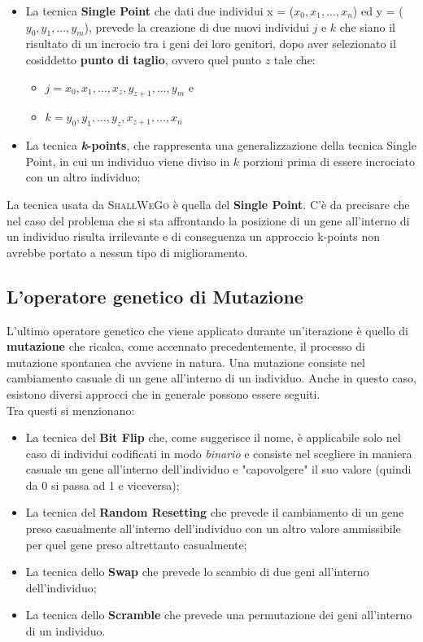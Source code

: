         \begin{itemize}
            \item La tecnica \textbf{Single Point} che dati due individui x = ($x_{0}, x_{1}, ..., x_{n}$) ed y = ($y_{0}, y_{1}, ..., y_{m}$), prevede la creazione di due nuovi individui $j$ e $k$ che siano il risultato di un incrocio tra i geni dei loro genitori, dopo aver selezionato il cosiddetto \textbf{punto di taglio}, ovvero quel punto $z$ tale che:
                \begin{itemize}
                    \item $j = x_{0}, x_{1}, ..., x_{z}, y_{z+1}, ..., y_{m}$ e
                    \item $k = y_{0}, y_{1}, ..., y_{z}, x_{z+1}, ..., x_{n}$
                \end{itemize}
            \item La tecnica \textbf{\textit{k}-points}, che rappresenta una generalizzazione della tecnica Single Point, in cui un individuo viene diviso in \textit{$k$} porzioni prima di essere incrociato con un altro individuo;
        \end{itemize}
        La tecnica usata da \textsc{ShallWeGo} è quella del \textbf{Single Point}. C'è da precisare che nel caso del problema che si sta affrontando la posizione di un gene all'interno di un individuo risulta irrilevante e di conseguenza un approccio k-points non avrebbe portato a nessun tipo di miglioramento.
    \subsection{L'operatore genetico di Mutazione}
        L'ultimo operatore genetico che viene applicato durante un'iterazione è quello di \textbf{mutazione} che ricalca, come accennato precedentemente, il processo di mutazione spontanea che avviene in natura. Una mutazione consiste nel cambiamento casuale di un gene all'interno di un individuo. Anche in questo caso, esistono diversi approcci che in generale possono essere seguiti. \\
        Tra questi si menzionano:
        \begin{itemize}
            \item La tecnica del \textbf{Bit Flip} che, come suggerisce il nome, è applicabile solo nel caso di individui codificati in modo \textit{binario} e consiste nel scegliere in maniera casuale un gene all'interno dell'individuo e "capovolgere" il suo valore (quindi da 0 si passa ad 1 e viceversa);
            \item La tecnica del \textbf{Random Resetting} che prevede il cambiamento di un gene preso casualmente all'interno dell'individuo con un altro valore ammissibile per quel gene preso altrettanto casualmente;
            \item La tecnica dello \textbf{Swap} che prevede lo scambio di due geni all'interno dell'individuo;
            \item La tecnica dello \textbf{Scramble} che prevede una permutazione dei geni all'interno di un individuo.
        \end{itemize}

